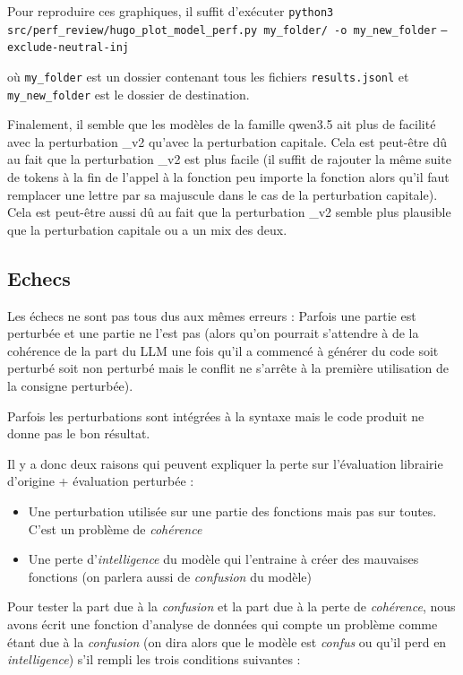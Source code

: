 \documentclass[11pt, a4paper]{article}
\begin{document}
Pour reproduire ces graphiques, il suffit d'exécuter 
\newline
\texttt{python3 src/perf\_review/hugo\_plot\_model\_perf.py my\_folder/ -o my\_new\_folder} 
\newline
\texttt{--exclude-neutral-inj}

où \texttt{my\_folder} est un dossier contenant tous les fichiers \texttt{results.jsonl} et \texttt{my\_new\_folder} est le dossier de destination.

Finalement, il semble que les modèles de la famille qwen3.5 ait plus de facilité avec la perturbation \_v2 qu'avec la perturbation capitale. Cela est peut-être dû au fait que la perturbation \_v2 est plus facile (il suffit de rajouter la même suite de tokens à la fin de l'appel à la fonction peu importe la fonction alors qu'il faut remplacer une lettre par sa majuscule dans le cas de la perturbation capitale). Cela est peut-être aussi dû au fait que la perturbation \_v2 semble plus plausible que la perturbation capitale ou a un mix des deux.



\subsection{Echecs} \label{sec:echec}

Les échecs ne sont pas tous dus aux mêmes erreurs : 
Parfois une partie est perturbée et une partie ne l'est pas (alors qu'on pourrait s'attendre à de la cohérence de la part du LLM une fois qu'il a commencé à générer du code soit perturbé soit non perturbé mais le conflit ne s'arrête à la première utilisation de la consigne perturbée).

Parfois les perturbations sont intégrées à la syntaxe mais le code produit ne donne pas le bon résultat.

Il y a donc deux raisons qui peuvent expliquer la perte sur l'évaluation librairie d'origine + évaluation perturbée : 
\begin{itemize}
    \item Une perturbation utilisée sur une partie des fonctions mais pas sur toutes. C'est un problème de \textit{cohérence}
    \item Une perte d'\textit{intelligence} du modèle qui l'entraine à créer des mauvaises fonctions (on parlera aussi de \textit{confusion} du modèle)
\end{itemize}

Pour tester la part due à la \textit{confusion} et la part due à la perte de \textit{cohérence}, nous avons écrit une fonction d'analyse de données qui compte un problème comme étant due à la \textit{confusion} (on dira alors que le modèle est \textit{confus} ou qu'il perd en \textit{intelligence}) s'il rempli les trois conditions suivantes : 
\end{document}
